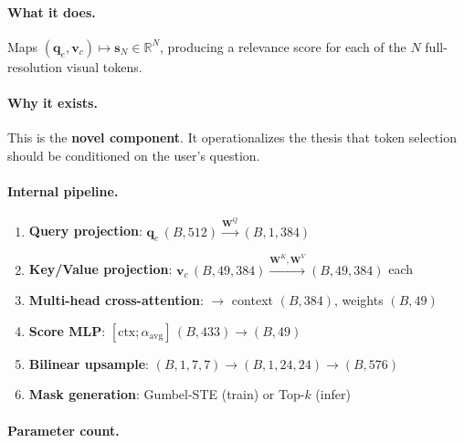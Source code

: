 \documentclass[11pt,a4paper]{article}
\newcommand{\R}{\mathbb{R}}
\newcommand{\vc}{\mathbf{v}_c}
\newcommand{\qe}{\mathbf{q}_e}
\newcommand{\vs}{\mathbf{s}}
\begin{document}
\paragraph{What it does.}
Maps $(\qe, \vc) \mapsto \vs_N \in \R^N$, producing a relevance score
for each of the $N$ full-resolution visual tokens.

\paragraph{Why it exists.}
This is the \textbf{novel component}. It operationalizes the thesis that
token selection should be conditioned on the user's question.

\paragraph{Internal pipeline.}
\begin{enumerate}[leftmargin=1.5em, itemsep=1pt]
  \item \textbf{Query projection}:
    $\qe\,(B,512) \xrightarrow{\mathbf{W}^Q} (B,1,384)$
  \item \textbf{Key/Value projection}:
    $\vc\,(B,49,384) \xrightarrow{\mathbf{W}^K, \mathbf{W}^V}
    (B,49,384)$ each
  \item \textbf{Multi-head cross-attention}:
    $\to$ context $(B,384)$, weights $(B,49)$
  \item \textbf{Score MLP}:
    $[\text{ctx};\alpha_{\text{avg}}]\,(B,433) \to (B,49)$
  \item \textbf{Bilinear upsample}:
    $(B,1,7,7) \to (B,1,24,24) \to (B,576)$
  \item \textbf{Mask generation}: Gumbel-STE (train) or Top-$k$ (infer)
\end{enumerate}

\paragraph{Parameter count.}
\end{document}
